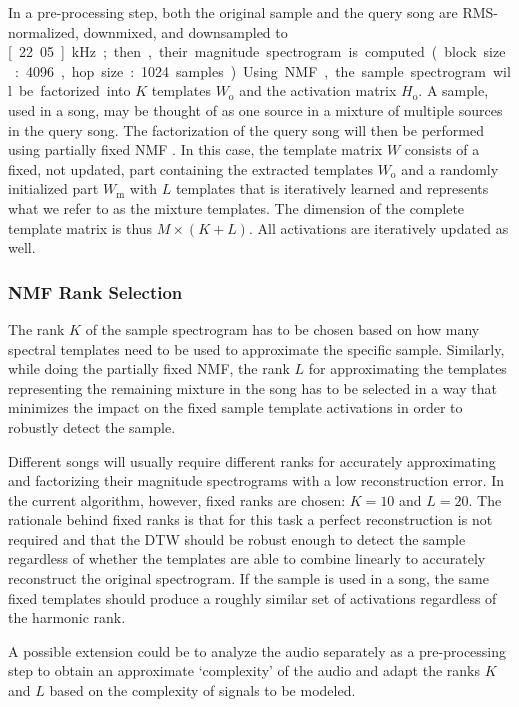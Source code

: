 \documentclass{article}
\begin{document}
In a pre-processing step, both the original sample and the query song are RMS-normalized, downmixed, and downsampled to \unit[22.05]{kHz}; then, their magnitude spectrogram is computed (block size: 4096, hop size: 1024 samples). %
Using NMF, the sample spectrogram will be factorized into $K$ templates $W_\mathrm{o}$ and the activation matrix $H_\mathrm{o}$. A sample, used in a song, may be thought of as one source in a mixture of multiple sources in the query song. 
The factorization of the query song will then be performed using partially fixed NMF \cite{wu_drum_2015,wu2015drum}. In this case, the template matrix $W$ consists of a fixed, not updated, part containing the extracted templates $W_\mathrm{o}$ and a randomly initialized part $W_\mathrm{m}$ with $L$ templates that is iteratively learned and represents what we refer to as the mixture templates. The dimension of the complete template matrix is thus $M\times (K+L)$. All activations are iteratively updated as well.

\subsubsection{NMF Rank Selection}
\label{nmfrank}
The rank $K$ of the sample spectrogram has to be chosen based on how many spectral templates need to be used to approximate the specific sample. Similarly, while doing the partially fixed NMF, the rank $L$ for approximating the templates representing the remaining mixture in the song has to be selected in a way that minimizes the impact on the fixed sample template activations in order to robustly detect the sample.

Different songs will usually require different ranks for accurately approximating and factorizing their magnitude spectrograms with a low reconstruction error. In the current algorithm, however, fixed ranks are chosen: $K=10$ and $L=20$. The rationale behind fixed ranks is that for this task a perfect reconstruction is not required and that the DTW should be robust enough to detect the sample regardless of whether the templates are able to combine linearly to accurately reconstruct the original spectrogram. If the sample is used in a song, the same fixed templates should produce a roughly similar set of activations regardless of the harmonic rank. 

A possible extension could be to analyze the audio separately as a pre-processing step to obtain an approximate `complexity' of the audio and adapt the ranks $K$ and $L$ based on the complexity of signals to be modeled. 
\end{document}
